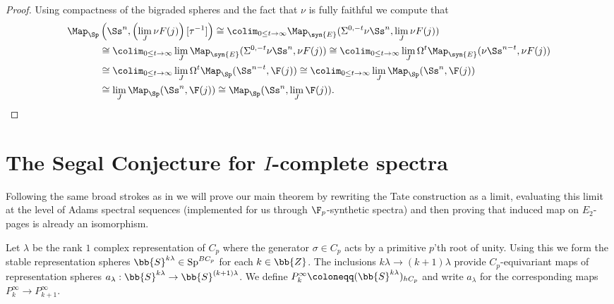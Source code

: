 \begin{proof}
    Using compactness of the bigraded spheres and the fact that $\nu$ is fully faithful we compute that
    \begin{align*} 
        \Map_{\Sp} & \left(\Ss^n, \left( \lim_J \nu F(j) \right)[\tau^{-1}] \right) 
        \cong \colim_{0 \leq t \to \infty} \Map_{\syn{E}}(\Sigma^{0,-t}\nu\Ss^{n}, \lim_J \nu F(j)) \\
        &\cong \colim_{0 \leq t \to \infty} \lim_J \Map_{\syn{E}}(\Sigma^{0,-t}\nu\Ss^{n}, \nu F(j))
        \cong \colim_{0 \leq t \to \infty} \lim_J \Omega^t \Map_{\syn{E}}(\nu\Ss^{n-t}, \nu F(j)) \\
        &\cong \colim_{0 \leq t \to \infty} \lim_J \Omega^t \Map_{\Sp}(\Ss^{n-t}, \F(j))
        \cong \colim_{0 \leq t \to \infty} \lim_J \Map_{\Sp}(\Ss^{n}, \F(j)) \\
        &\cong \lim_J \Map_{\Sp}(\Ss^{n}, \F(j))
        \cong \Map_{\Sp}(\Ss^{n}, \lim_J \F(j)).
    \end{align*}
\end{proof}

\section{The Segal Conjecture for $I$-complete spectra} \label{sec:main}

Following the same broad strokes as in \cite{lin1980conjectures} we will prove our main theorem by rewriting the Tate construction as a limit, evaluating this limit at the level of Adams spectral sequences (implemented for us through $\F_p$-synthetic spectra) and then proving that induced map on $E_2$-pages is already an isomorphism.


 






    





\begin{cons} \label{stuntedprojspectrum}
    Let $\lambda$ be the rank $1$ complex representation of $C_p$ where the generator $\sigma \in C_p$ acts by a primitive $p$'th root of unity. Using this we form the stable representation spheres $\bb{S}^{k\lambda} \in \mathrm{Sp}^{BC_p}$ for each $k \in \bb{Z}$. The inclusions $k\lambda \to (k+1)\lambda$ provide $C_p$-equivariant maps of representation spheres $a_\lambda : \bb{S}^{k\lambda} \to \bb{S}^{(k+1)\lambda}$. We define $ P^{\infty}_{k} \coloneqq (\bb{S}^{k\lambda})_{hC_p} $ and write $a_\lambda$ for the corresponding maps $P^\infty_k \to P^\infty_{k+1}$.
\end{cons}

